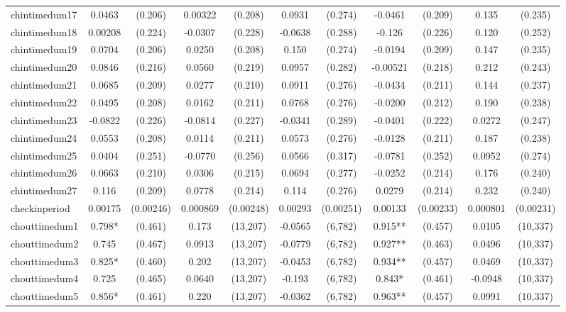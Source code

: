 \documentclass[]{article}
\begin{document}
\begin{tabular}{lcccccccccc}
chintimedum17 & 0.0463 & (0.206) & 0.00322 & (0.208) & 0.0931 & (0.274) & -0.0461 & (0.209) & 0.135 & (0.235) \\
chintimedum18 & 0.00208 & (0.224) & -0.0307 & (0.228) & -0.0638 & (0.288) & -0.126 & (0.226) & 0.120 & (0.252) \\
chintimedum19 & 0.0704 & (0.206) & 0.0250 & (0.208) & 0.150 & (0.274) & -0.0194 & (0.209) & 0.147 & (0.235) \\
chintimedum20 & 0.0846 & (0.216) & 0.0560 & (0.219) & 0.0957 & (0.282) & -0.00521 & (0.218) & 0.212 & (0.243) \\
chintimedum21 & 0.0685 & (0.209) & 0.0277 & (0.210) & 0.0911 & (0.276) & -0.0434 & (0.211) & 0.144 & (0.237) \\
chintimedum22 & 0.0495 & (0.208) & 0.0162 & (0.211) & 0.0768 & (0.276) & -0.0200 & (0.212) & 0.190 & (0.238) \\
chintimedum23 & -0.0822 & (0.226) & -0.0814 & (0.227) & -0.0341 & (0.289) & -0.0401 & (0.222) & 0.0272 & (0.247) \\
chintimedum24 & 0.0553 & (0.208) & 0.0114 & (0.211) & 0.0573 & (0.276) & -0.0128 & (0.211) & 0.187 & (0.238) \\
chintimedum25 & 0.0404 & (0.251) & -0.0770 & (0.256) & 0.0566 & (0.317) & -0.0781 & (0.252) & 0.0952 & (0.274) \\
chintimedum26 & 0.0663 & (0.210) & 0.0306 & (0.215) & 0.0694 & (0.277) & -0.0252 & (0.214) & 0.176 & (0.240) \\
chintimedum27 & 0.116 & (0.209) & 0.0778 & (0.214) & 0.114 & (0.276) & 0.0279 & (0.214) & 0.232 & (0.240) \\
checkinperiod & 0.00175 & (0.00246) & 0.000869 & (0.00248) & 0.00293 & (0.00251) & 0.00133 & (0.00233) & 0.000801 & (0.00231) \\
chouttimedum1 & 0.798* & (0.461) & 0.173 & (13,207) & -0.0565 & (6,782) & 0.915** & (0.457) & 0.0105 & (10,337) \\
chouttimedum2 & 0.745 & (0.467) & 0.0913 & (13,207) & -0.0779 & (6,782) & 0.927** & (0.463) & 0.0496 & (10,337) \\
chouttimedum3 & 0.825* & (0.460) & 0.202 & (13,207) & -0.0453 & (6,782) & 0.934** & (0.457) & 0.0469 & (10,337) \\
chouttimedum4 & 0.725 & (0.465) & 0.0640 & (13,207) & -0.193 & (6,782) & 0.843* & (0.461) & -0.0948 & (10,337) \\
chouttimedum5 & 0.856* & (0.461) & 0.220 & (13,207) & -0.0362 & (6,782) & 0.963** & (0.457) & 0.0991 & (10,337) \\

\end{tabular}
\end{document}
